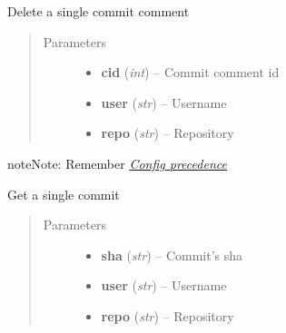 \documentclass[letterpaper,10pt,english]{sphinxmanual}
\begin{document}
\begin{fulllineitems}
\begin{fulllineitems}
\end{fulllineitems}


\begin{fulllineitems}
\label{repos:pygithub3.services.repos.Commits.delete_comment}
Delete a single commit comment
\begin{quote}\begin{description}
\item[{Parameters}] \leavevmode\begin{itemize}
\item {} 
\textbf{cid} (\emph{int}) -- Commit comment id

\item {} 
\textbf{user} (\emph{str}) -- Username

\item {} 
\textbf{repo} (\emph{str}) -- Repository

\end{itemize}

\end{description}\end{quote}

\begin{notice}{note}{Note:}
Remember {\hyperref[repos:config-precedence]{\emph{Config precedence}}}
\end{notice}

\end{fulllineitems}


\begin{fulllineitems}
\label{repos:pygithub3.services.repos.Commits.get}
Get a single commit
\begin{quote}\begin{description}
\item[{Parameters}] \leavevmode\begin{itemize}
\item {} 
\textbf{sha} (\emph{str}) -- Commit's sha

\item {} 
\textbf{user} (\emph{str}) -- Username

\item {} 
\textbf{repo} (\emph{str}) -- Repository


\end{itemize}
\end{description}
\end{quote}
\end{fulllineitems}
\end{fulllineitems}
\end{document}

